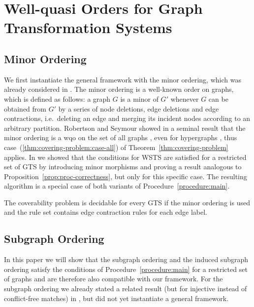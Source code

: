 \documentclass{llncs}
\begin{document}

\section{Well-quasi Orders for Graph Transformation Systems}
\label{sec:wqo-for-gts}

\subsection{Minor Ordering}\label{sec:minor-ordering}

We first instantiate the general framework with the minor ordering,
which was already considered in \cite{JK08}.
The minor ordering is a well-known order on graphs, which is defined
as follows: a graph $G$ is a minor of $G'$ whenever $G$ can be
obtained from $G'$ by a series of node deletions, edge deletions and
edge contractions, i.e.~deleting an edge and merging its incident nodes 
according to an arbitrary partition. Robertson and Seymour showed in a seminal 
result that the minor ordering is a wqo on the set of all
graphs \cite{rs:graph-minors-xx}, even for hypergraphs
\cite{RS:graphMinors:XXIII}, thus case~(\ref{thm:covering-problem:case-all}) of 
Theorem~\ref{thm:covering-problem} applies. In 
\cite{JK08,jk:minor-wqo-corrected} we showed that the conditions for WSTS are 
satisfied for a restricted set of GTS by introducing minor morphisms and 
proving a result analogous to Proposition~\ref{prop:proc-correctness}, but only 
for this specific case. The resulting algorithm is a special case of both 
variants of Procedure~\ref{procedure:main}.

\begin{proposition}[\cite{JK08}]
  The coverability problem is decidable for every GTS if the minor ordering is 
  used and the rule set contains edge contraction rules for
  each edge label.
\end{proposition}

\subsection{Subgraph Ordering}
\label{sec:subgraph-ordering}

In this paper we will show that the subgraph ordering and the induced
subgraph ordering satisfy the conditions of
Procedure~\ref{procedure:main} for a restricted set
of graphs and are therefore also compatible with our framework. For
the subgraph ordering we already stated a related result (but for
injective instead of conflict-free matches) in
\cite{bdkss:undecidability-gts}, but did not yet instantiate a general
framework.
\end{document}
